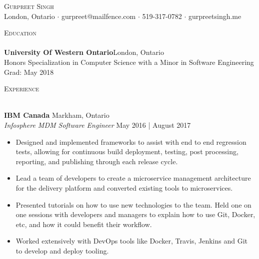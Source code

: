 \documentclass[a4paper]{article}
\newcommand{\lineunder} {
    \vspace*{-8pt} \\
    \hspace*{-18pt} \hrulefill \\
}
\newcommand{\header} [1] {
    {\hspace*{-18pt}\vspace*{6pt} \textsc{#1}}
    \vspace*{-6pt} \lineunder
}
\begin{document}
\vspace*{-40pt}

\vspace*{-10pt}
\begin{center}
	{\Huge \scshape {Gurpreet Singh}}\\
	London, Ontario $\cdot$ gurpreet@mailfence.com $\cdot$ 519-317-0782 $\cdot$ gurpreetsingh.me\\
\end{center}

\vspace*{2mm}

\header{Education}
\textbf{University Of Western Ontario}\hfill London, Ontario\\
Honors Specialization in Computer Science with a Minor in Software Engineering \hfill Grad: May 2018\\
\vspace{2mm}

\vspace*{2mm}

\header{Experience}
\vspace{1mm}

\textbf{IBM Canada} \hfill Markham, Ontario\\
\textit{Infosphere MDM Software Engineer} \hfill May 2016 | August 2017\\
\vspace{-1mm}
\begin{itemize} \itemsep 1pt
	\item Designed and implemented frameworks to assist with end to end regression tests, allowing for continuous build deployment, testing, post processing, reporting, and publishing through each release cycle.
	\item Lead a team of developers to create a microservice management architecture for the delivery platform and converted existing tools to microservices.
	\item Presented tutorials on how to use new technologies to the team. Held one on one sessions with developers and managers to explain how to use Git, Docker, etc, and how it could benefit their workflow.
	\item Worked extensively with DevOps tools like Docker, Travis, Jenkins and Git to develop and deploy tooling.
\end{itemize}
\end{document}
